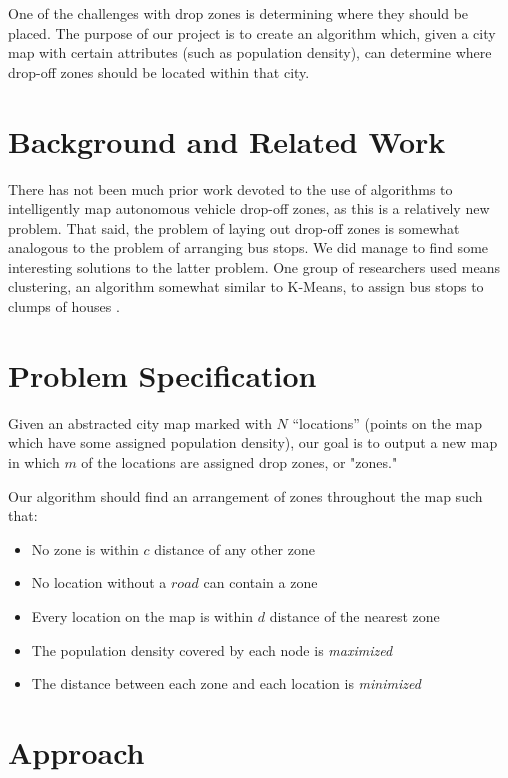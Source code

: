 \documentclass[11pt]{article}
\begin{document}
One of the challenges with drop zones is determining where they should be placed. The purpose of our project is to create an algorithm which, given a city map with certain attributes (such as population density), can determine where drop-off zones should be located within that city.


\section{Background and Related Work}

There has not been much prior work devoted to the use of algorithms to intelligently map autonomous vehicle drop-off zones, as this is a relatively new problem. That said, the problem of laying out drop-off zones is somewhat analogous to the problem of arranging bus stops. We did manage to find some interesting solutions to the latter problem. One group of researchers used means clustering, an algorithm somewhat similar to K-Means, to assign bus stops to clumps of houses \cite{busstops}.

\section{Problem Specification}

Given an abstracted city map marked with $N$ ``locations'' (points on the map which have some assigned population density), our goal is to output a new map in which $m$ of the locations are assigned drop zones, or "zones."
\newline

\noindent
Our algorithm should find an arrangement of zones throughout the map such that:
\begin{itemize}
    \item No zone is within $c$ distance of any other zone
    \item No location without a $road$ can contain a zone
    \item Every location on the map is within $d$ distance of the nearest zone
    \item The population density covered by each node is \textit{maximized}
    \item The distance between each zone and each location is \textit{minimized}
\end{itemize}

\section{Approach}
\end{document}
